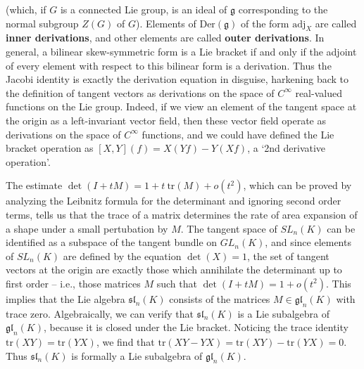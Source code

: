 \begin{example}
    (which, if $G$ is a connected Lie group, is an ideal of $\mathfrak{g}$ corresponding to the normal subgroup $Z(G)$ of $G$). Elements of $\text{Der}(\mathfrak{g})$ of the form $\text{adj}_X$ are called {\bf inner derivations}, and other elements are called {\bf outer derivations}. In general, a bilinear skew-symmetric form is a Lie bracket if and only if the adjoint of every element with respect to this bilinear form is a derivation. Thus the Jacobi identity is exactly the derivation equation in disguise, harkening back to the definition of tangent vectors as derivations on the space of $C^\infty$ real-valued functions on the Lie group. Indeed, if we view an element of the tangent space at the origin as a left-invariant vector field, then these vector field operate as derivations on the space of $C^\infty$ functions, and we could have defined the Lie bracket operation as $[X, Y](f) = X(Yf) - Y(Xf)$, a `2nd derivative operation'.
\end{example}

\begin{example}
    The estimate $\det(I + tM) = 1 + t\ \text{tr}(M) + o(t^2)$, which can be proved by analyzing the Leibnitz formula for the determinant and ignoring second order terms, tells us that the trace of a matrix determines the rate of area expansion of a shape under a small pertubation by $M$. The tangent space of $SL_n(K)$ can be identified as a subspace of the tangent bundle on $GL_n(K)$, and since elements of $SL_n(K)$ are defined by the equation $\det(X) = 1$, the set of tangent vectors at the origin are exactly those which annihilate the determinant up to first order -- i.e., those matrices $M$ such that $\det(I + tM) = 1 + o(t^2)$. This implies that the Lie algebra $\mathfrak{sl}_n(K)$ consists of the matrices $M \in \mathfrak{gl}_n(K)$ with trace zero. Algebraically, we can verify that $\mathfrak{sl}_n(K)$ is a Lie subalgebra of $\mathfrak{gl}_n(K)$, because it is closed under the Lie bracket. Noticing the trace identity $\text{tr}(XY) = \text{tr}(YX)$, we find that $\text{tr}(XY - YX) = \text{tr}(XY) - \text{tr}(YX) = 0$. Thus $\mathfrak{sl}_n(K)$ is formally a Lie subalgebra of $\mathfrak{gl}_n(K)$.
\end{example}

